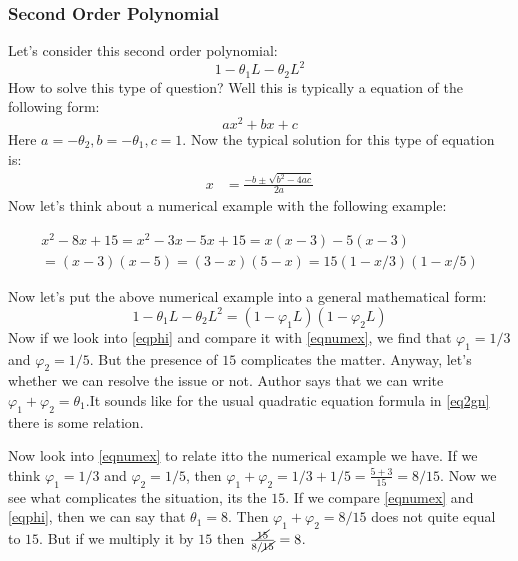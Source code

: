 \documentclass{book}
\begin{document}
\subsubsection{Second Order Polynomial}
Let's consider this second order polynomial:
    \begin{equation}
        1-\theta_1 L-\theta_2 L^2
        \label{eq:eq2pn}
    \end{equation}
    How to solve this type of question? Well this is typically a equation of the following form:
    \begin{equation} \label{eq2gn}
        ax^2+bx+c
    \end{equation}
    Here $a=-\theta_2, b=-\theta_1, c=1$. Now the typical solution for this type of equation is:
    \begin{align}
        x & =\frac{-b\pm \sqrt{b^2-4ac}}{2a}
        \label{eq:eqax2}
    \end{align}
    Now let's think about a numerical example with the following example: 
   
    \begin{multline}\label{eqnumex}
        x^2-8x+15=x^2-3x-5x+15=x(x-3)-5(x-3) \\
             =(x-3)(x-5)=(3-x)(5-x)=15(1-x/3)(1-x/5)
    \end{multline}
  
   Now let's put the above numerical example into a general mathematical form:
   \begin{equation}\label{eqphi}
       1-\theta_1 L-\theta_2 L^2=(1-\varphi_1 L)(1-\varphi_2 L)
   \end{equation}
   Now if we look into \eqref{eqphi} and compare it with \eqref{eqnumex}, we find that $\varphi_1=1/3$ and $\varphi_2=1/5$. But the presence of $15$ complicates the matter. Anyway, let's whether we can resolve the issue or not. Author says that we can write $\varphi_1+\varphi_2=\theta_1$.It sounds like for the usual quadratic equation formula in \eqref{eq2gn} there is some relation. 
   
   Now look into \eqref{eqnumex} to relate itto the numerical example we have. If we think $\varphi_1=1/3$ and $\varphi_2=1/5$, then $\varphi_1+\varphi_2=1/3+1/5=\frac{5+3}{15}=8/15$. Now we see what complicates the situation, its the $15$. If we compare \eqref{eqnumex} and \eqref{eqphi}, then we can say that $\theta_1=8$. Then $\varphi_1+\varphi_2=8/15$ does not quite equal to $15$. But if we multiply it by $15$ then $\frac{\cancel{15}}{8/\cancel{15}}=8$. 
   
\end{document}

